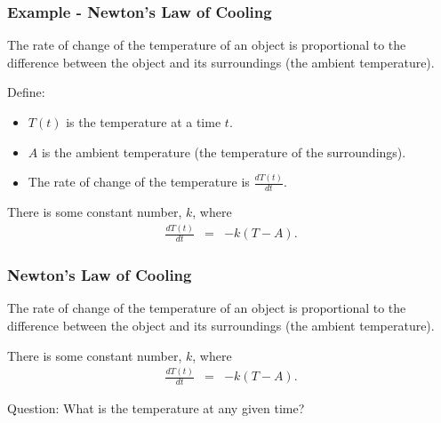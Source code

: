 \begin{frame}
  \frametitle{Example - Newton's Law of Cooling}

  The rate of change of the temperature of an object is proportional
  to the difference between the object and its surroundings (the
  ambient temperature).

  {

    Define:
    \begin{itemize}
    \item $T(t)$ is the temperature at a time $t$.
    \item $A$ is the ambient temperature (the temperature of the
      surroundings).
    \item The rate of change of the temperature is $\frac{dT(t)}{dt}$.
    \end{itemize}

  }

  {

    There is some constant number, $k$, where 
    \begin{eqnarray*}
      \frac{dT(t)}{dt} & = & -k (T-A).
    \end{eqnarray*}

  }


\end{frame}


\begin{frame}
  \frametitle{Newton's Law of Cooling}

  The rate of change of the temperature of an object is proportional
  to the difference between the object and its surroundings (the
  ambient temperature).

    There is some constant number, $k$, where 
    \begin{eqnarray*}
      \frac{dT(t)}{dt} & = & -k (T-A).
    \end{eqnarray*}

    Question: What is the temperature at any given time?

\end{frame}


